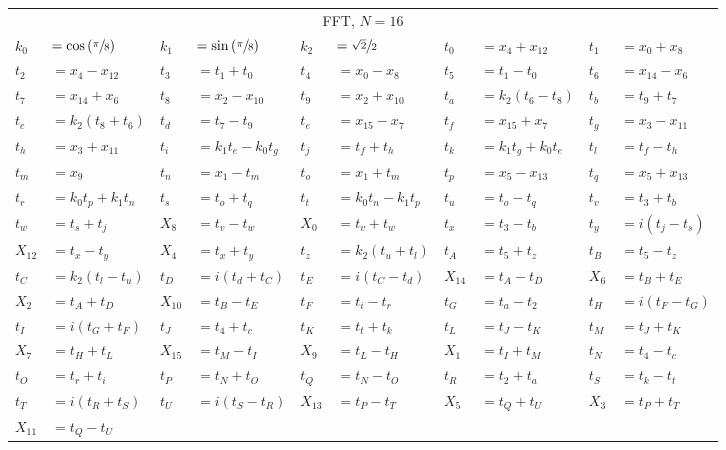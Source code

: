 \begin{tabular}{|p{4.3pt}l|p{4.3pt}l|p{4.3pt}l|p{4.3pt}l|p{4.3pt}l|}\toprule \multicolumn{10}{|c|}{FFT, $N=16$} \\
$k_0 $ &$= \cos\left(\sfrac{\pi}{8}\right)$ & $k_1 $ &$= \sin\left(\sfrac{\pi}{8}\right)$ & $k_2 $ &$= \sfrac{\sqrt{2}}{2}$ & $t_0 $ &$= x_4 + x_{12}$ & $t_1 $ &$= x_0 + x_8$\\ 
$t_2 $ &$= x_4 - x_{12}$ & $t_3 $ &$= t_1 + t_0$ & $t_4 $ &$= x_0 - x_8$ & $t_5 $ &$= t_1 - t_0$ & $t_6 $ &$= x_{14} - x_6$\\ 
$t_7 $ &$= x_{14} + x_6$ & $t_8 $ &$= x_2 - x_{10}$ & $t_9 $ &$= x_2 + x_{10}$ & $t_a $ &$= k_2(t_6 - t_8)$ & $t_b $ &$= t_9 + t_7$\\ 
$t_c $ &$= k_2(t_8 + t_6)$ & $t_d $ &$= t_7 - t_9$ & $t_e $ &$= x_{15} - x_7$ & $t_f $ &$= x_{15} + x_7$ & $t_g $ &$= x_3 - x_{11}$\\ 
$t_h $ &$= x_3 + x_{11}$ & $t_i $ &$= k_1t_e - k_0t_g$ & $t_j $ &$= t_f + t_h$ & $t_k $ &$= k_1t_g + k_0t_e$ & $t_l $ &$= t_f - t_h$\\ 
$t_m $ &$= x_9$ & $t_n $ &$= x_1 - t_m$ & $t_o $ &$= x_1 + t_m$ & $t_p $ &$= x_5 - x_{13}$ & $t_q $ &$= x_5 + x_{13}$\\ 
$t_r $ &$= k_0t_p + k_1t_n$ & $t_s $ &$= t_o + t_q$ & $t_t $ &$= k_0t_n - k_1t_p$ & $t_u $ &$= t_o - t_q$ & $t_v $ &$= t_3 + t_b$\\ 
$t_w $ &$= t_s + t_j$ & $X_8 $ &$= t_v - t_w$ & $X_0 $ &$= t_v + t_w$ & $t_x $ &$= t_3 - t_b$ & $t_y $ &$= i(t_j - t_s)$\\ 
$X_{12} $ &$= t_x - t_y$ & $X_4 $ &$= t_x + t_y$ & $t_z $ &$= k_2(t_u + t_l)$ & $t_A $ &$= t_5 + t_z$ & $t_B $ &$= t_5 - t_z$\\ 
$t_C $ &$= k_2(t_l - t_u)$ & $t_D $ &$= i(t_d + t_C)$ & $t_E $ &$= i(t_C - t_d)$ & $X_{14} $ &$= t_A - t_D$ & $X_6 $ &$= t_B + t_E$\\ 
$X_2 $ &$= t_A + t_D$ & $X_{10} $ &$= t_B - t_E$ & $t_F $ &$= t_i - t_r$ & $t_G $ &$= t_a - t_2$ & $t_H $ &$= i(t_F - t_G)$\\ 
$t_I $ &$= i(t_G + t_F)$ & $t_J $ &$= t_4 + t_c$ & $t_K $ &$= t_t + t_k$ & $t_L $ &$= t_J - t_K$ & $t_M $ &$= t_J + t_K$\\ 
$X_7 $ &$= t_H + t_L$ & $X_{15} $ &$= t_M - t_I$ & $X_9 $ &$= t_L - t_H$ & $X_1 $ &$= t_I + t_M$ & $t_N $ &$= t_4 - t_c$\\ 
$t_O $ &$= t_r + t_i$ & $t_P $ &$= t_N + t_O$ & $t_Q $ &$= t_N - t_O$ & $t_R $ &$= t_2 + t_a$ & $t_S $ &$= t_k - t_t$\\ 
$t_T $ &$= i(t_R + t_S)$ & $t_U $ &$= i(t_S - t_R)$ & $X_{13} $ &$= t_P - t_T$ & $X_5 $ &$= t_Q + t_U$ & $X_3 $ &$= t_P + t_T$\\ 
$X_{11} $ &\multicolumn{9}{l|}{$= t_Q - t_U$}\\ 
\bottomrule\end{tabular}
